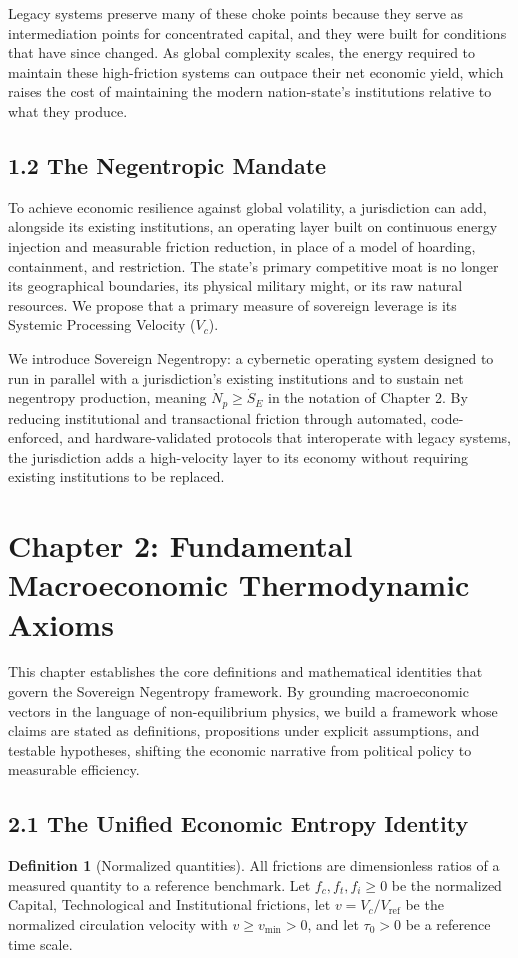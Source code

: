 \documentclass[11pt,a4paper]{article}
\theoremstyle{definition}
\newtheorem{definition}{Definition}
\theoremstyle{plain}
\theoremstyle{remark}
\begin{document}
Legacy systems preserve many of these choke points because they serve as intermediation points for concentrated capital, and they were built for conditions that have since changed. As global complexity scales, the energy required to maintain these high-friction systems can outpace their net economic yield, which raises the cost of maintaining the modern nation-state's institutions relative to what they produce.

\subsection*{1.2 The Negentropic Mandate}
To achieve economic resilience against global volatility, a jurisdiction can add, alongside its existing institutions, an operating layer built on continuous energy injection and measurable friction reduction, in place of a model of hoarding, containment, and restriction. The state's primary competitive moat is no longer its geographical boundaries, its physical military might, or its raw natural resources. We propose that a primary measure of sovereign leverage is its Systemic Processing Velocity ($V_c$).

We introduce Sovereign Negentropy: a cybernetic operating system designed to run in parallel with a jurisdiction's existing institutions and to sustain net negentropy production, meaning $\dot N_p \ge \dot S_E$ in the notation of Chapter 2. By reducing institutional and transactional friction through automated, code-enforced, and hardware-validated protocols that interoperate with legacy systems, the jurisdiction adds a high-velocity layer to its economy without requiring existing institutions to be replaced.

\clearpage
\clearpage
\section*{Chapter 2: Fundamental Macroeconomic Thermodynamic Axioms}
This chapter establishes the core definitions and mathematical identities that govern the Sovereign Negentropy framework. By grounding macroeconomic vectors in the language of non-equilibrium physics, we build a framework whose claims are stated as definitions, propositions under explicit assumptions, and testable hypotheses, shifting the economic narrative from political policy to measurable efficiency.

\subsection*{2.1 The Unified Economic Entropy Identity}
\begin{definition}[Normalized quantities]\label{def:norm}
All frictions are dimensionless ratios of a measured quantity to a reference benchmark. Let $f_c, f_t, f_i \ge 0$ be the normalized Capital, Technological and Institutional frictions, let $v = V_c/V_{\mathrm{ref}}$ be the normalized circulation velocity with $v \ge v_{\min} > 0$, and let $\tau_0 > 0$ be a reference time scale.
\end{definition}
\end{document}
